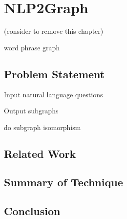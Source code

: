 \chapter{NLP2Graph}
\label{Ch-4:Sec:NLP2Graph}

(consider to remove this chapter)

word phrase graph

\section{Problem Statement}

Input natural language questions

Output subgraphs

do subgraph isomorphism

\section{Related Work}

\section{Summary of Technique}

\section{Conclusion}